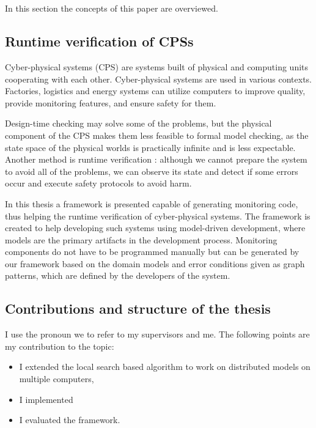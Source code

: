 \chapter{\bevezetes}
In this section the concepts of this paper are overviewed. 

\section{Runtime verification of CPSs}
Cyber-physical systems (CPS) \cite{Krupitzer2015,Nielsen2015,Sztipanovits2012}  are systems built of physical and computing units cooperating with each other.
Cyber-physical systems are used in various contexts. 
Factories, logistics and energy systems can utilize computers to improve quality, provide monitoring features, and ensure safety for them.

Design-time checking may solve some of the problems, but the physical component of the CPS makes them less feasible to formal model checking, as the state space of the physical worlds is practically infinite and is less expectable.
Another method is runtime verification \cite{fasecikk}: although we cannot prepare the system to avoid all of the problems, we can observe its state and detect if some errors occur and execute safety protocols to avoid harm. 


In this thesis a framework is presented capable of generating monitoring code, thus helping the runtime verification of cyber-physical systems. 
The framework is created to help developing such systems using model-driven development, where models are the primary artifacts in the development process.
Monitoring components do not have to be programmed manually but can be generated by our framework based on the domain models and error conditions given as graph patterns, which are defined by the developers of the system.

\section{Contributions and structure of the thesis}

I use the pronoun we to refer to my supervisors and me. 
The following points are my contribution to the topic:
\begin{itemize}
	\item I extended the local search based algorithm to work on distributed models on multiple computers,
	\item I implemented 
	\item I evaluated the framework.
\end{itemize}
	
